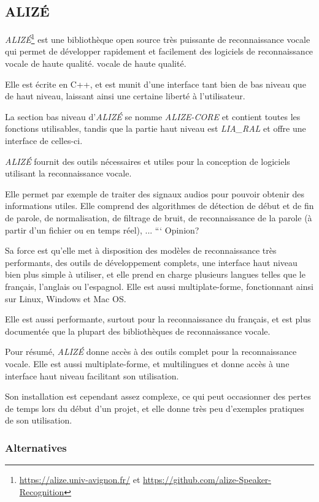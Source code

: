 
\subsection{ALIZÉ}
\label{subsec:ALIZE}
\textit{ALIZÉ}\footnote{\url{https://alize.univ-avignon.fr/} et \url{https://github.com/alize-Speaker-Recognition}} est une bibliothèque open source très puissante de reconnaissance vocale
qui permet de développer rapidement et facilement des logiciels de reconnaissance vocale de haute qualité.
vocale de haute qualité.

Elle est écrite en C++, et est munit d'une interface tant bien de bas niveau que de haut niveau, laissant ainsi une certaine liberté à l'utilisateur.

La section bas niveau d'\textit{ALIZÉ} se nomme \textit{ALIZE-CORE} et contient toutes les fonctions utilisables, tandis que la partie haut niveau est \textit{LIA\_RAL} et offre une interface de celles-ci.

\textit{ALIZÉ} fournit des outils nécessaires et utiles pour la conception de logiciels utilisant la reconnaissance vocale.

Elle permet par exemple de traiter des signaux audios pour pouvoir obtenir des informations utiles. Elle comprend des algorithmes de détection de début et de fin de parole, de normalisation,
de filtrage de bruit, de reconnaissance de la parole (à partir d'un fichier ou en temps réel), ...
``` Opinion?

Sa force est qu'elle met à disposition des modèles de reconnaissance très performants, des outils de développement complets, une interface haut niveau bien plus simple à utiliser, et
elle prend en charge plusieurs langues telles que le français, l'anglais ou l'espagnol. Elle est aussi multiplate-forme, fonctionnant ainsi sur Linux, Windows et Mac OS.

Elle est aussi performante, surtout pour la reconnaissance du français, et est plus documentée que la plupart des bibliothèques de reconnaissance vocale.

Pour résumé, \textit{ALIZÉ} donne accès à des outils complet pour la reconnaissance vocale. Elle est aussi multiplate-forme, et multilingues et donne accès
à une interface haut niveau facilitant son utilisation.

Son installation est cependant assez complexe, ce qui peut occasionner des pertes de temps lors du début d'un projet, et elle donne très peu d'exemples pratiques de son utilisation.


\subsubsection*{Alternatives}

